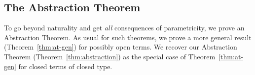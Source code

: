 \documentclass[runningheads]{llncs}
\newcommand{\set}{\mathsf{Set}}
\newcommand{\map}{\mathsf{map}}
\begin{document}
\begin{comment}
So, we can conclude that
\begin{equation}
\map_{\setsem{\Gamma; \ol\alpha \vdash G} \rho[\ol{\alpha := \_}]} \ol{y}
  \circ 
  x_{\ol{{\setsem{\Gamma; \emptyset \vdash \sigma} \rho}}}
= x_{\ol{\setsem{\Gamma; \emptyset \vdash \tau} \rho} }
\circ \map_{\setsem{\Gamma; \ol\alpha \vdash F} 
  \rho[\ol{\alpha := \_}]} \, \ol{y}
\end{equation}

Moreover, for any $\ol{A, B: \set}$,
we can choose $\ol{\sigma = v}$ and $\ol{\tau = w}$ to be variables such that
$\ol{\rho v = A}$ and $\ol{\rho w = B}$.
Then for any functions $\ol{f : A \to B}$ we have that
\begin{equation}
\map_{\setsem{\Gamma; \ol\alpha \vdash G} \rho[\ol{\alpha := \_}]} \ol{f}
  \circ 
  x_{\ol{A}}
  = x_{\ol{B}}
\circ \map_{\setsem{\Gamma; \ol\alpha \vdash F} 
  \rho[\ol{\alpha := \_}]} \, \ol{f}
\end{equation}
\end{proof}
\end{comment}

\subsection{The Abstraction Theorem}\label{sec:thms} 

To go beyond naturality and get {\em all} consequences of
parametricity, we prove an Abstraction Theorem. As usual for such
theorems, we prove a more general result (Theorem~\ref{thm:at-gen})
for possibly open terms. We recover our Abstraction Theorem
(Theorem~\ref{thm:abstraction}) as the special case of
Theorem~\ref{thm:at-gen} for closed terms of closed type.
\end{document}
